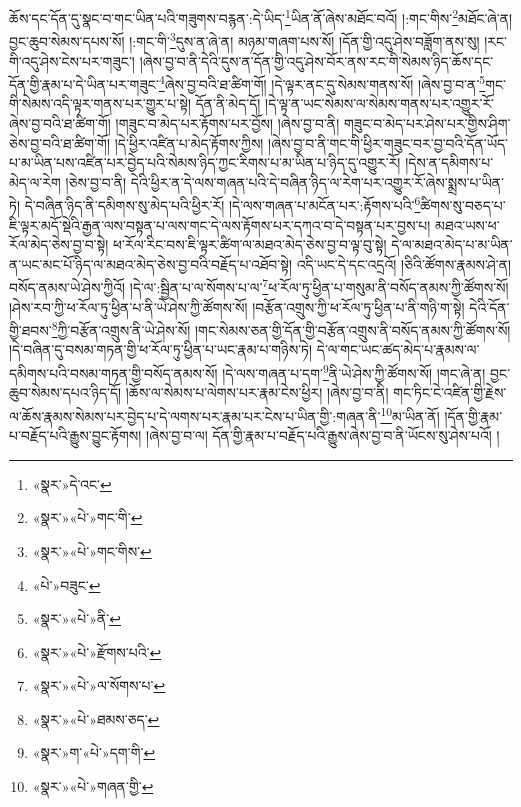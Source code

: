 ཆོས་དང་དོན་དུ་སྣང་བ་གང་ཡིན་པའི་གཟུགས་བརྙན་:དེ་ཡིད་\footnote{«སྣར་»དེ་འང་}ཡིན་ནོ་ཞེས་མཐོང་བའོ། །:གང་གིས་\footnote{«སྣར་»«པེ་»གང་གི་}མཐོང་ཞེ་ན། བྱང་ཆུབ་སེམས་དཔས་སོ། །:གང་གི་\footnote{«སྣར་»«པེ་»གང་གིས་}དུས་ན་ཞེ་ན། མཉམ་གཞག་པས་སོ། །དོན་གྱི་འདུ་ཤེས་བཟློག་ནས་སུ། །རང་གི་འདུ་ཤེས་ངེས་པར་གཟུང་། །ཞེས་བྱ་བ་ནི་དེའི་དུས་ན་དོན་གྱི་འདུ་ཤེས་བོར་ནས་རང་གི་སེམས་ཉིད་ཆོས་དང་དོན་གྱི་རྣམ་པ་དེ་ཡིན་པར་གཟུང་\footnote{«པེ་»བཟུང་}ཞེས་བྱ་བའི་ཐ་ཚིག་གོ། །དེ་ལྟར་ནང་དུ་སེམས་གནས་སོ། །ཞེས་བྱ་བ་ན་\footnote{«སྣར་»«པེ་»ནི་}གང་གི་སེམས་འདི་ལྟར་གནས་པར་གྱུར་པ་སྟེ། དོན་ནི་མེད་དོ། །དེ་ལྟ་ན་ཡང་སེམས་ལ་སེམས་གནས་པར་འགྱུར་རོ་ཞེས་བྱ་བའི་ཐ་ཚིག་གོ། །གཟུང་བ་མེད་པར་རྟོགས་པར་བྱོས། །ཞེས་བྱ་བ་ནི། གཟུང་བ་མེད་པར་ཤེས་པར་གྱིས་ཤིག་ཅེས་བྱ་བའི་ཐ་ཚིག་གོ། །དེ་ཕྱིར་འཛིན་པ་མེད་རྟོགས་ཀྱིས། །ཞེས་བྱ་བ་ནི་གང་གི་ཕྱིར་གཟུང་བར་བྱ་བའི་དོན་ཡོད་པ་མ་ཡིན་པས་འཛིན་པར་བྱེད་པའི་སེམས་ཉིད་ཀྱང་རིགས་པ་མ་ཡིན་པ་ཉིད་དུ་འགྱུར་རོ། །དེས་ན་དམིགས་པ་མེད་ལ་རེག །ཅེས་བྱ་བ་ནི། དེའི་ཕྱིར་ན་དེ་ལས་གཞན་པའི་དེ་བཞིན་ཉིད་ལ་རེག་པར་འགྱུར་རོ་ཞེས་སྨྲས་པ་ཡིན་ཏེ། དེ་བཞིན་ཉིད་ནི་དམིགས་སུ་མེད་པའི་ཕྱིར་རོ། །དེ་ལས་གཞན་པ་མངོན་པར་:རྟོགས་པའི་\footnote{«སྣར་»«པེ་»རྫོགས་པའི་}ཚིགས་སུ་བཅད་པ་ཇི་ལྟར་མདོ་སྡེའི་རྒྱན་ལས་བསྟན་པ་ལས་གང་དེ་ལས་རྟོགས་པར་དཀའ་བ་དེ་བསྟན་པར་བྱས་པ། མཐའ་ཡས་ཕ་རོལ་མེད་ཅེས་བྱ་བ་སྟེ། ཕ་རོལ་རིང་བས་ཇི་ལྟར་ཚིག་ལ་མཐའ་མེད་ཅེས་བྱ་བ་ལྟ་བུ་སྟེ། དེ་ལ་མཐའ་མེད་པ་མ་ཡིན་ན་ཡང་མང་པོ་ཉིད་ལ་མཐའ་མེད་ཅེས་བྱ་བའི་བརྗོད་པ་འཐོབ་སྟེ། འདི་ཡང་དེ་དང་འདྲའོ། །ཅིའི་ཚོགས་རྣམས་ཤེ་ན། བསོད་ནམས་ཡེ་ཤེས་ཀྱིའོ། །དེ་ལ་:སྦྱིན་པ་ལ་སོགས་པ་ལ་\footnote{«སྣར་»«པེ་»ལ་སོགས་པ་}ཕ་རོལ་ཏུ་ཕྱིན་པ་གསུམ་ནི་བསོད་ནམས་ཀྱི་ཚོགས་སོ། །ཤེས་རབ་ཀྱི་ཕ་རོལ་ཏུ་ཕྱིན་པ་ནི་ཡེ་ཤེས་ཀྱི་ཚོགས་སོ། །བརྩོན་འགྲུས་ཀྱི་ཕ་རོལ་ཏུ་ཕྱིན་པ་ནི་གཉི་ག་སྟེ། དེའི་དོན་གྱི་ཐབས་\footnote{«སྣར་»«པེ་»ཐམས་ཅད་}ཀྱི་བརྩོན་འགྲུས་ནི་ཡེ་ཤེས་སོ། །གང་སེམས་ཅན་གྱི་དོན་གྱི་བརྩོན་འགྲུས་ནི་བསོད་ནམས་ཀྱི་ཚོགས་སོ། །དེ་བཞིན་དུ་བསམ་གཏན་གྱི་ཕ་རོལ་ཏུ་ཕྱིན་པ་ཡང་རྣམ་པ་གཉིས་ཏེ། དེ་ལ་གང་ཡང་ཚད་མེད་པ་རྣམས་ལ་དམིགས་པའི་བསམ་གཏན་གྱི་བསོད་ནམས་སོ། །དེ་ལས་གཞན་པ་དག་\footnote{«སྣར་»ག་«པེ་»དག་གི་}ནི་ཡེ་ཤེས་ཀྱི་ཚོགས་སོ། །གང་ཞེ་ན། བྱང་ཆུབ་སེམས་དཔའ་ཉིད་དོ། །ཆོས་ལ་སེམས་པ་ལེགས་པར་རྣམ་ངེས་ཕྱིར། །ཞེས་བྱ་བ་ནི། གང་ཏིང་ངེ་འཛིན་གྱི་རྗེས་ལ་ཆོས་རྣམས་སེམས་པར་བྱེད་པ་དེ་ལགས་པར་རྣམ་པར་ངེས་པ་ཡིན་གྱི་:གཞན་ནི་\footnote{«སྣར་»«པེ་»གཞན་གྱི་}མ་ཡིན་ནོ། །དོན་གྱི་རྣམ་པ་བརྗོད་པའི་རྒྱུས་བྱུང་རྟོགས། །ཞེས་བྱ་བ་ལ། དོན་གྱི་རྣམ་པ་བརྗོད་པའི་རྒྱུས་ཞེས་བྱ་བ་ནི་ཡོངས་སུ་ཤེས་པའོ། །
